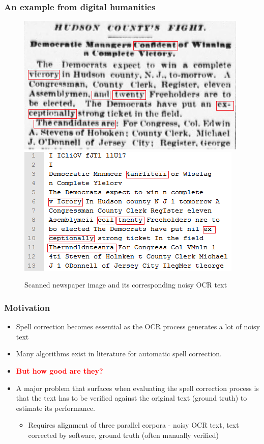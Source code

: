 \documentclass{beamer}
\begin{document}
\begin{frame}
\frametitle{An example from digital humanities}
\begin{figure}[ht]
\begin{center}
\includegraphics[scale=0.5]{images/originalimage}
\includegraphics[scale=0.5]{images/ocr}
\caption{Scanned newspaper image and its corresponding noisy OCR text}
\end{center}
\end{figure}
\end{frame}

\begin{frame}
\frametitle{Motivation}
\begin{itemize}
 \justifying
\item
Spell correction becomes essential as the OCR process generates a lot of noisy text
\item Many algorithms exist in literature for automatic spell correction.
\item \textcolor{red}{\textbf{But how good are they?}}
\item A major problem that surfaces when evaluating the spell correction process is that the text has to be verified against the original text (ground truth) to estimate its performance. 
 \begin{itemize}
 \item Requires alignment of three parallel corpora - noisy OCR text, text corrected by software, ground truth (often manually verified)
 \end{itemize}
\end{itemize}
\end{frame}
\end{document}
